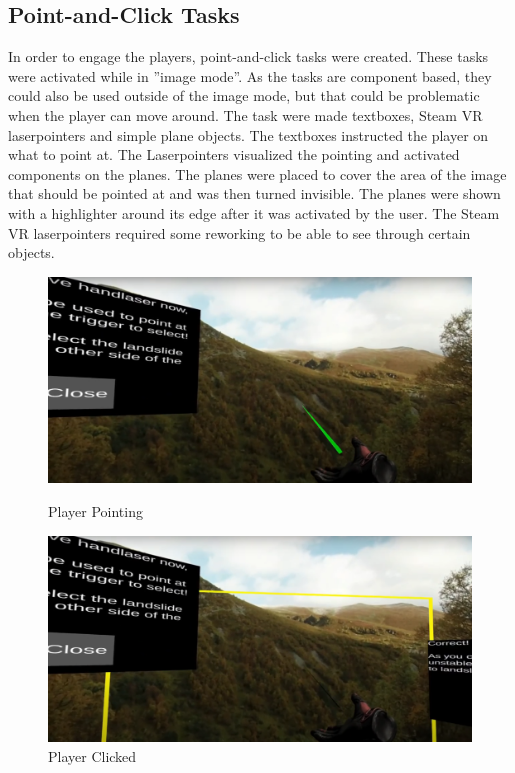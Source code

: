         
    \subsection{Point-and-Click Tasks}
        In order to engage the players, point-and-click tasks were created. These tasks were activated while in ''image mode''. As the tasks are component based, they could also be used outside of the image mode, but that could be problematic when the player can move around. The task were made textboxes, Steam VR laserpointers and simple plane objects. The textboxes instructed the player on what to point at. The Laserpointers visualized the pointing and activated components on the planes. The planes were placed to cover the area of the image that should be pointed at and was then turned invisible. The planes were shown with a highlighter around its edge after it was activated by the user. The Steam VR laserpointers required some reworking to be able to see through certain objects.
        
        \FloatBarrier
        \begin{figure}[htbp]
            \centering
            \begin{minipage}[b]{0.45\textwidth}
                \includegraphics[width=\textwidth]{figures/point_and_click.PNG}
                \caption{Player Pointing}
            \end{minipage}
            \begin{minipage}[b]{0.45\textwidth}
                \includegraphics[width=\textwidth]{figures/point_and_click_clicked.PNG}
                \caption{Player Clicked}
            \end{minipage}
        \end{figure}
        \FloatBarrier
    
